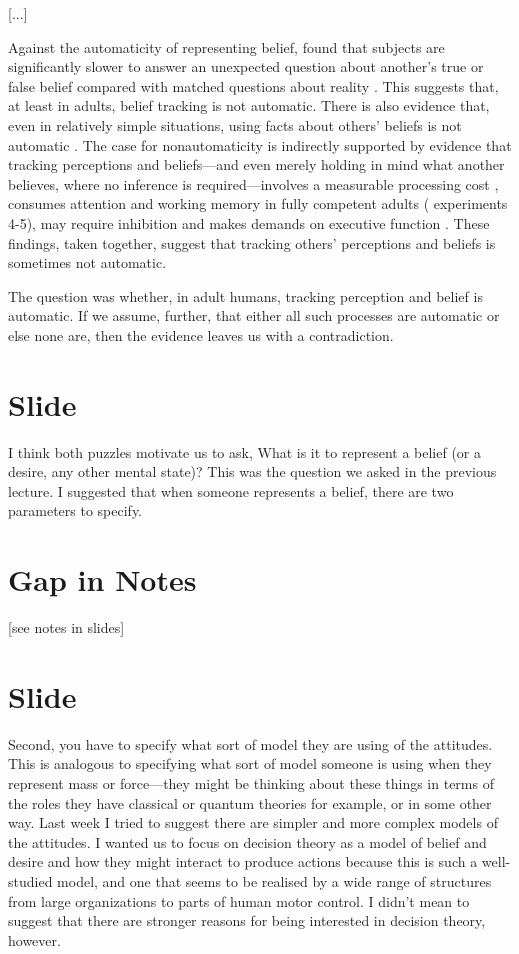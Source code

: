 \documentclass[12pt,\papersize]{extarticle}
\begin{document}
[...]

Against the automaticity of representing belief,
\citet{back:2010_apperly} found that subjects are significantly slower to answer an unexpected question about another's true or false belief compared with matched questions about reality \citep[see also][]{apperly:2006_belief}.
This suggests that, at least in adults, belief tracking is not automatic.
There is also evidence that, even in relatively simple situations, 
using facts about others' beliefs is not automatic \citep{Keysar:2003xu,apperly:2010_limits}.
The case for nonautomaticity is indirectly supported by evidence that tracking perceptions and beliefs---and even merely holding in mind what another believes, where no inference is required---involves a measurable processing cost  \citep{apperly:2008_back,apperly:2010_limits}, consumes attention and working memory in fully competent adults (\citealp{Apperly:2009cc, lin:2010_reflexively, McKinnon:2007rr} experiments 4-5), may require inhibition \citep{bull:2008_role} and makes demands on executive function \citep{apperly:2004_frontal,samson:2005_seeing}.
These findings, taken together, suggest that tracking others' perceptions and beliefs is sometimes not automatic.

The question was whether, in adult humans,  tracking perception and belief is automatic.  
If we assume, further, that either all such processes are automatic or else none are, then the evidence leaves us with a contradiction.


\section{Slide}
I think both puzzles motivate us to ask, 
What is it to represent a belief (or a desire, any other mental state)?
This was the question we asked in the previous lecture.
I suggested that when someone represents a belief, there are two parameters to specify.


\section{Gap in Notes}
[see notes in slides]

\section{Slide}
Second, you have to specify what sort of model they are using of the attitudes.
This is analogous to specifying what sort of model someone is using when they represent mass or force---they might be thinking about these things in terms of the roles they have classical or quantum theories for example, or in some other way.
Last week I tried to suggest there are simpler and more complex models of the attitudes.
I wanted us to focus on decision theory as a model of belief and desire and how they might interact to produce actions because this is such a well-studied model, and one that seems to be realised by a wide range of structures from large organizations to parts of human motor control.
I didn’t mean to suggest that there are stronger reasons for being interested in decision theory, however.
\end{document}
